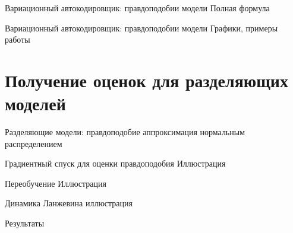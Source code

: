 \documentclass[10pt,pdf,utf8,russian,aspectratio=169]{beamer}
\begin{document}
\begin{frame}{Вариационный автокодировщик: правдоподобии модели}
Полная формула 
\end{frame}

\begin{frame}{Вариационный автокодировщик: правдоподобии модели}
Графики, примеры работы
\end{frame}

\section{Получение оценок для разделяющих моделей}
\begin{frame}{Разделяющие модели: правдоподобие}
аппроксимация нормальным распределением
\end{frame}

\begin{frame}{Градиентный спуск для оценки правдоподобия}
Иллюстрация
\end{frame}

\begin{frame}{Переобучение}
Иллюстрация
\end{frame}

\begin{frame}{Динамика Ланжевина}
иллюстрация
\end{frame}

\begin{frame}{Результаты}
\end{frame}
\end{document}
